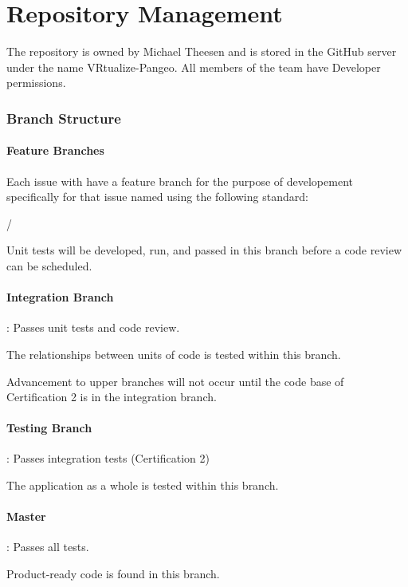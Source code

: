 \chapter{Repository Management}

The repository is owned by Michael Theesen and is stored in the GitHub server under the name VRtualize-Pangeo. All members of the team have Developer permissions.


\subsection{Branch Structure}
\label{\detokenize{test_plan/repository_management:branch-structure}}
\noindent{}


\subsubsection{Feature Branches}
\label{\detokenize{test_plan/repository_management:feature-branches}}
Each issue with have a feature branch for the purpose of developement specifically for that issue named using the following standard:

/

Unit tests will be developed, run, and passed in this branch before a code review can be scheduled.


\subsubsection{Integration Branch}
\label{\detokenize{test_plan/repository_management:integration-branch}}
: Passes unit tests and code review.

The relationships between units of code is tested within this branch.

Advancement to upper branches will not occur until the code base of Certification 2 is in the integration branch.


\subsubsection{Testing Branch}
\label{\detokenize{test_plan/repository_management:testing-branch}}
: Passes integration tests (Certification 2)

The application as a whole is tested within this branch.


\subsubsection{Master}
\label{\detokenize{test_plan/repository_management:master}}
: Passes all tests.

Product-ready code is found in this branch.



\renewcommand{\indexname}{Index}
\printindex